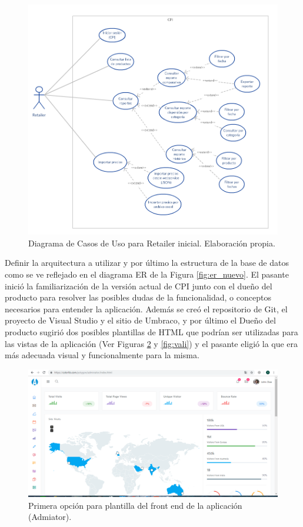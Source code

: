   \begin{figure}[H]
  \begin{center}
  \includegraphics[width=\textwidth]{cu_retailer_inicial.png}
  \caption{Diagrama de Casos de Uso para Retailer inicial. Elaboración propia.}
  \label{fig:cu_retailer_inicial}
  \end{center}
  \end{figure}
Definir la arquitectura a utilizar y por último la estructura de la base de datos como se ve reflejado en el diagrama ER de la Figura \ref{fig:er_nuevo}. El pasante inició la familiarización de la versión actual de CPI junto con el dueño del producto para resolver las posibles dudas de la funcionalidad, o conceptos necesarios para entender la aplicación. Además se creó el repositorio de Git, el proyecto de Visual Studio y el sitio de Umbraco, y por último el Dueño del producto sugirió dos posibles plantillas de HTML que podrían ser utilizadas para las vistas de la aplicación (Ver Figuras \ref{fig:adminator} y \ref{fig:vali}) y el pasante eligió la que era más adecuada visual y funcionalmente para la misma.

\begin{figure}[H]
  \begin{center}
  \includegraphics[width=\textwidth]{adminator.png}
  \caption{Primera opción para plantilla del front end de la aplicación (Admiator).}
  \label{fig:adminator}
  \end{center}
  \end{figure}

